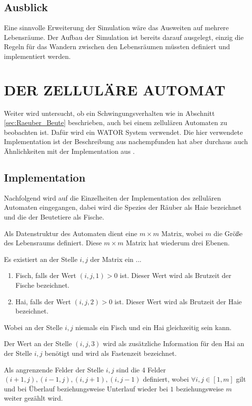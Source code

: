 \documentclass[a4paper,twoside]{article}
\begin{document}
	\subsection{Ausblick}
	Eine sinnvolle Erweiterung der Simulation wäre das Ausweiten auf mehrere Lebensräume. Der Aufbau der Simulation ist bereits darauf ausgelegt, einzig die Regeln für das Wandern zwischen den Lebensräumen müssten definiert und implementiert werden.
	
	\section{\uppercase{Der zelluläre Automat}}
	
	Weiter wird untersucht, ob ein Schwingungsverhalten wie in Abschnitt \ref{sec:Raeuber_Beute} beschrieben, auch bei einem zellulären Automaten zu beobachten ist. Dafür wird ein WATOR System verwendet. Die hier verwendete Implementation ist der Beschreibung aus \cite{Wator} nachempfunden hat aber durchaus auch Ähnlichkeiten mit der Implementation aus \cite{PlanetWator}.
	
	\subsection{Implementation}
	Nachfolgend wird auf die Einzelheiten der Implementation des zellulären Automaten eingegangen, dabei wird die Spezies der Räuber als Haie bezeichnet und die der Beutetiere als Fische.
	
	Als Datenstruktur des Automaten dient eine \(m \times m\) Matrix, wobei \(m\) die Größe des Lebensraums definiert. Diese \(m \times m\) Matrix hat wiederum drei Ebenen.
	
	Es existiert an der Stelle \(i,j\) der Matrix ein ...
	\begin{enumerate}[label=...]
		\item Fisch, falls der Wert \((i,j,1) > 0\) ist. Dieser Wert wird als Brutzeit der Fische bezeichnet.
		\item Hai, falls der Wert \((i,j,2) > 0\) ist. Dieser Wert wird als Brutzeit der Haie bezeichnet.
	\end{enumerate}
	Wobei an der Stelle \(i,j\) niemals ein Fisch und ein Hai gleichzeitig sein kann.

	Der Wert an der Stelle \((i,j,3)\) wird als zusätzliche Information für den Hai an der Stelle \(i,j\) benötigt und wird als Fastenzeit bezeichnet.

	Als angrenzende Felder der Stelle \(i,j\) sind die 4 Felder \((i+1,j), (i-1,j), (i,j+1), (i,j-1)\) definiert, wobei \( \forall i,j \in [1,m] \) gilt und bei Überlauf beziehungsweise Unterlauf wieder bei \(1\) beziehungsweise \(m\) weiter gezählt wird.
	
\end{document}
